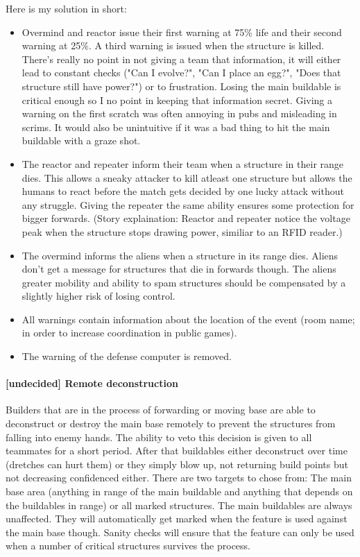 \documentclass{scrartcl}
\newcommand{\undecided}[0]{\textcolor{undecided}{\textbf{[undecided] }}}
\begin{document}
Here is my solution in short:

\begin{itemize}
\item Overmind and reactor issue their first warning at 75\% life and their second warning at 25\%. A third warning is issued when the structure is killed. There's really no point in not giving a team that information, it will either lead to constant checks ("Can I evolve?", "Can I place an egg?", "Does that structure still have power?") or to frustration. Losing the main buildable is critical enough so I no point in keeping that information secret. Giving a warning on the first scratch was often annoying in pubs and misleading in scrims. It would also be unintuitive if it was a bad thing to hit the main buildable with a graze shot.
\item The reactor and repeater inform their team when a structure in their range dies. This allows a sneaky attacker to kill atleast one structure but allows the humans to react before the match gets decided by one lucky attack without any struggle. Giving the repeater the same ability ensures some protection for bigger forwards. (Story explaination: Reactor and repeater notice the voltage peak when the structure stops drawing power, similiar to an RFID reader.)
\item The overmind informs the aliens when a structure in its range dies. Aliens don't get a message for structures that die in forwards though. The aliens greater mobility and ability to spam structures should be compensated by a slightly higher risk of losing control.
\item All warnings contain information about the location of the event (room name; in order to increase coordination in public games).
\item The warning of the defense computer is removed.
\end{itemize}

\paragraph{\undecided Remote deconstruction}

Builders that are in the process of forwarding or moving base are able to deconstruct or destroy the main base remotely to prevent the structures from falling into enemy hands. The ability to veto this decision is given to all teammates for a short period. After that buildables either deconstruct over time (dretches can hurt them) or they simply blow up, not returning build points but not decreasing confidenced either. There are two targets to chose from: The main base area (anything in range of the main buildable and anything that depends on the buildables in range) or all marked structures. The main buildables are always unaffected. They will automatically get marked when the feature is used against the main base though. Sanity checks will ensure that the feature can only be used when a number of critical structures survives the process.
\end{document}

